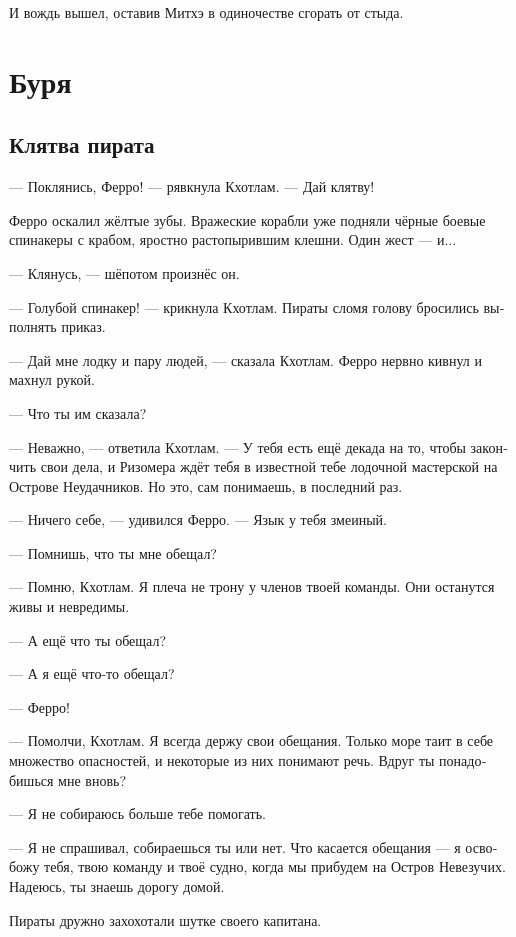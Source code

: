 \documentclass[a4paper,12pt,fleqn]{book}\usepackage{cooltooltips}\usepackage{polyglossia}\setdefaultlanguage{russian}\setotherlanguage{english}\defaultfontfeatures{Ligatures=TeX,Mapping=tex-text} \usepackage{xcolor}\definecolor{lightgray}{HTML}{bbbbbb}\color{lightgray}\newcommand{\ml}[3]{\textenglish{\textcolor{black}{#3}}}
\newcommand{\asterism}{\vspace{1em}{\centering\Large\bfseries$\ast~\ast~\ast$\par}\vspace{1em}}
\begin{document}
И вождь вышел, оставив Митхэ в одиночестве сгорать от стыда.

\chapter{Буря}

\section{Клятва пирата}

--- Поклянись, Ферро! --- рявкнула Кхотлам.
--- Дай клятву!

Ферро оскалил жёлтые зубы.
Вражеские корабли уже подняли чёрные боевые спинакеры с крабом, яростно растопырившим клешни.
Один жест --- и...

--- Клянусь, --- шёпотом произнёс он.

--- Голубой спинакер! --- крикнула Кхотлам.
Пираты сломя голову бросились выполнять приказ.

--- Дай мне лодку и пару людей, --- сказала Кхотлам.
Ферро нервно кивнул и махнул рукой.

\asterism

--- Что ты им сказала?

--- Неважно, --- ответила Кхотлам.
--- У тебя есть ещё декада на то, чтобы закончить свои дела, и Ризомера ждёт тебя в известной тебе лодочной мастерской на Острове Неудачников.
Но это, сам понимаешь, в последний раз.

--- Ничего себе, --- удивился Ферро.
--- Язык у тебя змеиный.

--- Помнишь, что ты мне обещал?

--- Помню, Кхотлам.
Я плеча не трону у членов твоей команды.
Они останутся живы и невредимы.

--- А ещё что ты обещал?

--- А я ещё что-то обещал?

--- Ферро!

--- Помолчи, Кхотлам.
Я всегда держу свои обещания.
Только море таит в себе множество опасностей, и некоторые из них понимают речь.
Вдруг ты понадобишься мне вновь?

--- Я не собираюсь больше тебе помогать.

--- Я не спрашивал, собираешься ты или нет.
Что касается обещания --- я освобожу тебя, твою команду и твоё судно, когда мы прибудем на Остров Невезучих.
Надеюсь, ты знаешь дорогу домой.

Пираты дружно захохотали шутке своего капитана.
\end{document}

